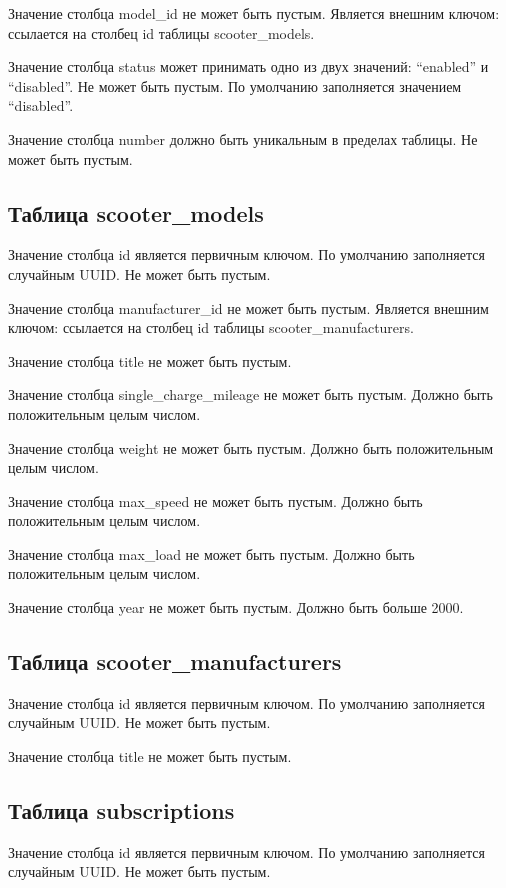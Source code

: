 Значение столбца model\_id не может быть пустым. Является внешним ключом: ссылается на столбец id таблицы scooter\_models.

Значение столбца status может принимать одно из двух значений: \enquote{enabled} и \enquote{disabled}. Не может быть пустым. По умолчанию заполняется значением \enquote{disabled}.

Значение столбца number должно быть уникальным в пределах таблицы. Не может быть пустым.

\subsection{Таблица scooter\_models}

Значение столбца id является первичным ключом. По умолчанию заполняется случайным UUID. Не может быть пустым.

Значение столбца manufacturer\_id не может быть пустым. Является внешним ключом: ссылается на столбец id таблицы scooter\_manufacturers.

Значение столбца title не может быть пустым.

Значение столбца single\_charge\_mileage не может быть пустым. Должно быть положительным целым числом.

Значение столбца weight не может быть пустым. Должно быть положительным целым числом.

Значение столбца max\_speed не может быть пустым. Должно быть положительным целым числом.

Значение столбца max\_load не может быть пустым. Должно быть положительным целым числом.

Значение столбца year не может быть пустым. Должно быть больше 2000.

\subsection{Таблица scooter\_manufacturers}

Значение столбца id является первичным ключом. По умолчанию заполняется случайным UUID. Не может быть пустым.

Значение столбца title не может быть пустым.

\subsection{Таблица subscriptions}

Значение столбца id является первичным ключом. По умолчанию заполняется случайным UUID. Не может быть пустым.

